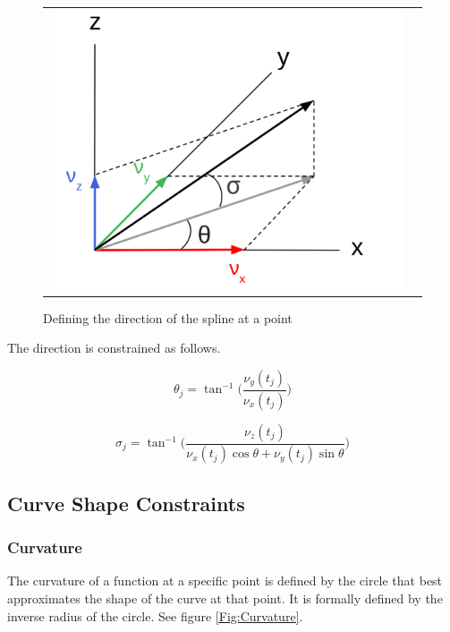 \documentclass{article}
\begin{document}
\begin{figure}[h]
\begin{tabular}{ll}
\includegraphics[scale=.3]{directions.png}
\end{tabular}
\caption{Defining the direction of the spline at a point}
\label{Fig:directions.png}
\end{figure}

The direction is constrained as follows.

\begin{equation}
    \theta_j = \tan^{-1} \Big( \frac{\nu_y(t_j)}{\nu_x(t_j)}\Big)
\end{equation}

\begin{equation}
    \sigma_j = \tan^{-1} \Big(\frac{\nu_z(t_j)}{\nu_x(t_j)\cos\theta + \nu_y(t_j) \sin\theta}  \Big)
\end{equation}

\subsection{Curve Shape Constraints}

\subsubsection{Curvature}

The curvature of a function at a specific point is defined by the circle that best approximates the shape of the curve at that point. It is formally defined by the inverse radius of the circle. See figure \ref{Fig:Curvature}. 
\end{document}

